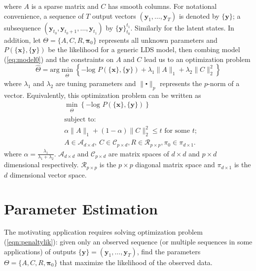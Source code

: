 \documentclass[fleqn]{article}
\let\oldref\ref
\renewcommand{\ref}[1]{(\oldref{#1})}
\begin{document}
where $A$ is a sparse matrix and $C$ has smooth columns. For notational convenience, a sequence of $T$ output vectors $(\mathbf{y}_1,\ldots,\mathbf{y}_T)$ is denoted by $\{\mathbf{y}\}$; a subsequence $(\mathbf{y}_{t_0},\mathbf{y}_{t_0 + 1},\ldots,\mathbf{y}_{t_1})$ by $\{\mathbf{y}\}_{t_0}^{t_1}$. Similarly for the latent states. In addition, let $\Theta =\{A,C,R,\mathbf{\pi}_0\}$ represents all unknown parameters and $P(\{\mathbf{x}\},\{\mathbf{y}\})$ be the likelihood for a generic LDS model, then combing model \ref{eq:model0} and the constraints on $A$ and $C$ lead us to an optimization problem
\begin{equation}\label{eqn:penaltylik}
\hat{\Theta}=\text{arg}\min_{\substack{\Theta}}\left\{-\text{log }P(\{\textbf{x}\},\{\textbf{y}\})+\lambda_1\|A\|_1+\lambda_2\|C\|_2^2\right\}
\end{equation}
where $\lambda_1$ and $\lambda_2$ are tuning parameters and $\|\centerdot\|_p$ represents the $p$-norm of a vector. Equivalently, this optimization problem can be written as
\begin{equation}\label{eqn:penaltylikdual}
\begin{aligned}
&\min_{\substack{\Theta}}\left\{-\text{log }P(\{\textbf{x}\},\{\textbf{y}\})\right\}\\
&\text{subject to: }\\
&\alpha\|A\|_1+ (1-\alpha)\|C\|_2^2 \leq t \text{ for some }t;\\
&A\in \mathcal{A}_{d\times d},\ C \in \mathcal{C}_{p \times d}, R \in \mathcal{R}_{p\times p}, \pi_0 \in \mathcal{\pi}_{d\times 1}.
\end{aligned}
\end{equation}
where $\alpha = \frac{\lambda_1}{\lambda_1 + \lambda_2}$. $\mathcal{A}_{d\times d}$ and $\mathcal{C}_{p \times d}$ are matrix spaces of $d\times d$ and $p \times d$ dimensional respectively. $\mathcal{R}_{p \times p}$ is the $p \times p$ diagonal matrix space and $\mathcal{\pi}_{d\times 1}$ is the $d$ dimensional vector space.
\section{Parameter Estimation}
The motivating application requires solving optimization problem \ref{eqn:penaltylik}: given only an observed sequence (or multiple sequences in some applications) of outputs $\{\mathbf{y}\}=(\mathbf{y}_1,\ldots,\mathbf{y}_T)$, find the parameters $\Theta=\{A,C,R,\mathbf{\pi}_0\}$ that maximize the likelihood of the observed data.
\end{document}
